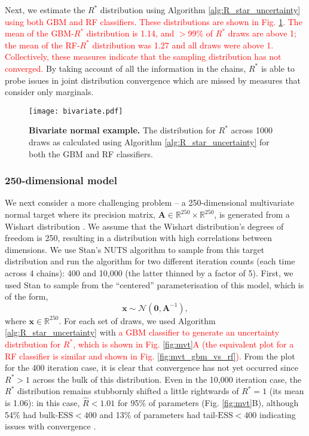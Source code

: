 \documentclass{article}
\begin{document}
Next, we estimate the $R^*$ distribution using Algorithm \ref{alg:R_star_uncertainty} \textcolor{red}{using both GBM and RF classifiers. These distributions are shown in Fig. \ref{fig:bivariate}. The mean of the GBM-$R^*$ distribution is 1.14, and $>$99\% of $R^*$ draws are above 1; the mean of the RF-$R^*$ distribution was 1.27 and all draws were above 1. Collectively, these measures indicate that the sampling distribution has not converged.} By taking account of all the information in the chains, $R^*$ is able to probe issues in joint distribution convergence which are missed by measures that consider only marginals.

\begin{figure}[!htb]
	\centerline{\texttt{[image: bivariate.pdf]}}
	\caption{\textbf{Bivariate normal example.} The distribution for $R^*$ across 1000 draws as calculated using Algorithm \ref{alg:R_star_uncertainty} for both the GBM and RF classifiers.}
	\label{fig:bivariate}
\end{figure}

\subsubsection{250-dimensional model}\label{sec:multivariate_normal_250}
We next consider a more challenging problem -- a 250-dimensional multivariate normal target where its precision matrix, $\boldsymbol{A}\in\mathbb{R}^{250}\times\mathbb{R}^{250}$, is generated from a Wishart distribution \citep{hoffman2014no}. We assume that the Wishart distribution's degrees of freedom is 250, resulting in a distribution with high correlations between dimensions. We use Stan's NUTS algorithm to sample from this target distribution and run the algorithm for two different iteration counts (each time across 4 chains): 400 and 10,000 (the latter thinned by a factor of 5). First, we used Stan to sample from the ``centered'' parameterisation of this model, which is of the form,
%
\begin{equation}\label{eq:mvt_normal_250}
\boldsymbol{x}\sim \mathcal{N}(\boldsymbol{0},\boldsymbol{A}^{-1}),
\end{equation}
%
where $\boldsymbol{x}\in\mathbb{R}^{250}$. For each set of draws, we used Algorithm \ref{alg:R_star_uncertainty} with \textcolor{red}{a GBM classifier to generate an uncertainty distribution for $R^*$, which is shown in Fig. \ref{fig:mvt}A (the equivalent plot for a RF classifier is similar and shown in Fig. \ref{fig:mvt_gbm_vs_rf}).} From the plot for the 400 iteration case, it is clear that convergence has not yet occurred since $R^*>1$ across the bulk of this distribution. Even in the 10,000 iteration case, the $R^*$ distribution remains stubbornly shifted a little rightwards of $R^*=1$ (its mean is 1.06): in this case, $\widehat{R}<1.01$ for 95\% of parameters (Fig. \ref{fig:mvt}B), although 54\% had bulk-$\text{ESS}<400$ and 13\% of parameters had tail-$\text{ESS}<400$ indicating issues with convergence \citep{vehtari2019rank}.
\end{document}
